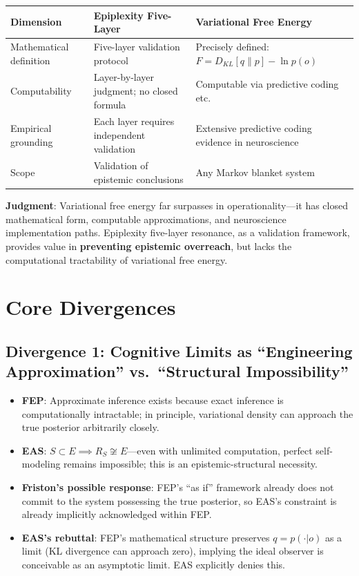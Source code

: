 \documentclass[11pt,a4paper]{article}
\begin{document}
\begin{center}
\begin{tabular}{@{}lll@{}}
\toprule
\textbf{Dimension} & \textbf{Epiplexity Five-Layer} & \textbf{Variational Free Energy} \\
\midrule
Mathematical definition & Five-layer validation protocol & Precisely defined: $F = D_{KL}[q\|p] - \ln p(o)$ \\
Computability & Layer-by-layer judgment; no closed formula & Computable via predictive coding etc. \\
Empirical grounding & Each layer requires independent validation & Extensive predictive coding evidence in neuroscience \\
Scope & Validation of epistemic conclusions & Any Markov blanket system \\
\bottomrule
\end{tabular}
\end{center}

\textbf{Judgment}: Variational free energy far surpasses in operationality---it has closed mathematical form, computable approximations, and neuroscience implementation paths. Epiplexity five-layer resonance, as a validation framework, provides value in \textbf{preventing epistemic overreach}, but lacks the computational tractability of variational free energy.

\section{Core Divergences}

\subsection{Divergence 1: Cognitive Limits as ``Engineering Approximation'' vs.\ ``Structural Impossibility''}

\begin{itemize}[leftmargin=*]
\item \textbf{FEP}: Approximate inference exists because exact inference is computationally intractable; in principle, variational density can approach the true posterior arbitrarily closely.
\item \textbf{EAS}: $S \subset E \implies R_S \not\cong E$---even with unlimited computation, perfect self-modeling remains impossible; this is an epistemic-structural necessity.
\item \textbf{Friston's possible response}: FEP's ``as if'' framework already does not commit to the system possessing the true posterior, so EAS's constraint is already implicitly acknowledged within FEP.
\item \textbf{EAS's rebuttal}: FEP's mathematical structure preserves $q = p(\cdot|o)$ as a limit (KL divergence can approach zero), implying the ideal observer is conceivable as an asymptotic limit. EAS explicitly denies this.
\end{itemize}
\end{document}
